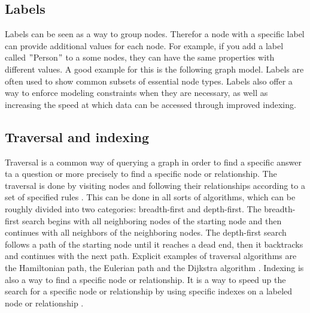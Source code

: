 \subsection{Labels} \label{subsec:labels}
Labels can be seen as a way to group nodes.
Therefor a node with a specific label can provide additional values for each node.
For example, if you add a label called \("\)Person\("\) to a some nodes, they can have the same properties with different values.
A good example for this is the following graph model.
Labels are often used to show common subsets of essential node types.
Labels also offer a way to enforce modeling constraints when they are necessary, as well as increasing the speed at which data
can be accessed through improved indexing. \parencite[compare P. 6f.]{PractivalNeo4j}

\subsection{Traversal and indexing}\label{subsec:traversal-and-indexing}
Traversal is a common way of querying a graph in order to find a specific answer ta a question or more precisely to find a
specific node or relationship.
The traversal is done by visiting nodes and following their relationships according to a set of specified rules \parencite[compare P.7]{PractivalNeo4j}.
This can be done in all sorts of algorithms, which can be roughly divided into two categories: breadth-first and depth-first.
The breadth-first  search begins with all neighboring nodes of the starting node and then continues with all neighbors of the neighboring nodes.
The depth-first search follows a path of the starting node until it reaches a dead end, then it backtracks and continues with the next path.
Explicit examples of traversal algorithms are the Hamiltonian path, the Eulerian path and the Dijkstra algorithm \parencite[compare]{juypiter:Graph}.
Indexing is also a way to find a specific node or relationship.
It is a way to speed up the search for a specific node or relationship by using specific indexes on a labeled node or relationship \parencite[compare P.7]{PractivalNeo4j}.